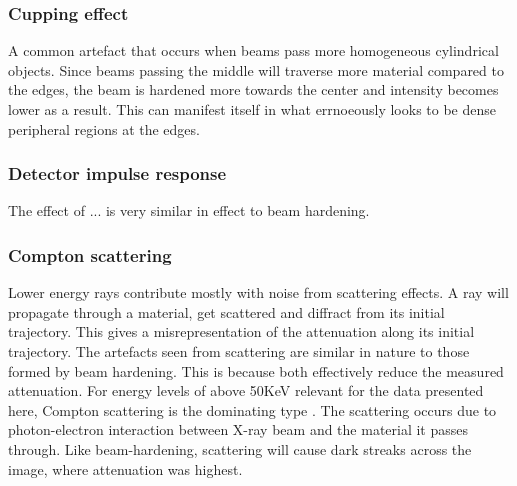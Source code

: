 \subsubsection{Cupping effect}

A common artefact that occurs when beams pass more homogeneous cylindrical objects. Since beams
passing the middle will traverse more material compared to the edges, the beam is hardened more
towards the center and intensity becomes lower as a result. This can manifest itself in what
errnoeously looks to be dense peripheral regions at the edges.

\subsubsection{Detector impulse response}

The effect of ... is very similar in effect to beam hardening.


\subsubsection{Compton scattering}

Lower energy rays contribute mostly with noise from scattering effects. A ray will propagate through
a material, get scattered and diffract from its initial trajectory. This gives a misrepresentation
of the attenuation along its initial trajectory. The artefacts seen from scattering are similar in
nature to those formed by beam hardening. This is because both effectively reduce the measured
attenuation. For energy levels of above 50KeV relevant for the data presented here, Compton
scattering is the dominating type \citep{compton}. The scattering occurs due to photon-electron
interaction between X-ray beam and the material it passes through. Like beam-hardening, scattering
will cause dark streaks across the image, where attenuation was highest.

